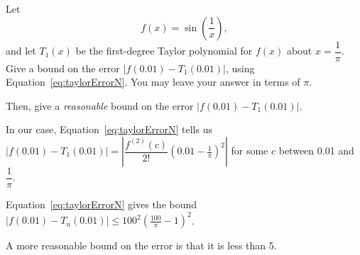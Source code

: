 \begin{question}
Let \[f(x)= \sin\left(\dfrac{1}{x}\right),\] and let $T_1(x)$ be the first-degree Taylor polynomial for $f(x)$ about $x=\dfrac{1}{\pi}$. Give a bound on the error $|f(0.01)-T_1(0.01)|$, using Equation~\ref*{eq:taylorErrorN}. You may leave your answer in terms of $\pi$.

Then, give a \emph{reasonable} bound on the error $|f(0.01)-T_1(0.01)|$.
\end{question}
\begin{hint}
In our case, Equation~\ref*{eq:taylorErrorN} tells us\\
$\left|f\left(0.01\right)-T_1\left(0.01\right)\right| = \left|\dfrac{f^{(2)}(c)}{2!}\left(0.01-\frac{1}{\pi}\right)^2\right|$ for some $c$ between 0.01 and $\dfrac{1}{\pi}$.
\end{hint}
\begin{answer}
Equation~\ref*{eq:taylorErrorN}  gives the bound
$|f(0.01)-T_n(0.01)| \leq 100^2\left(\frac{100}{\pi}-1\right)^2$.

A more reasonable bound on the error is that it is less than 5.
\end{answer}
